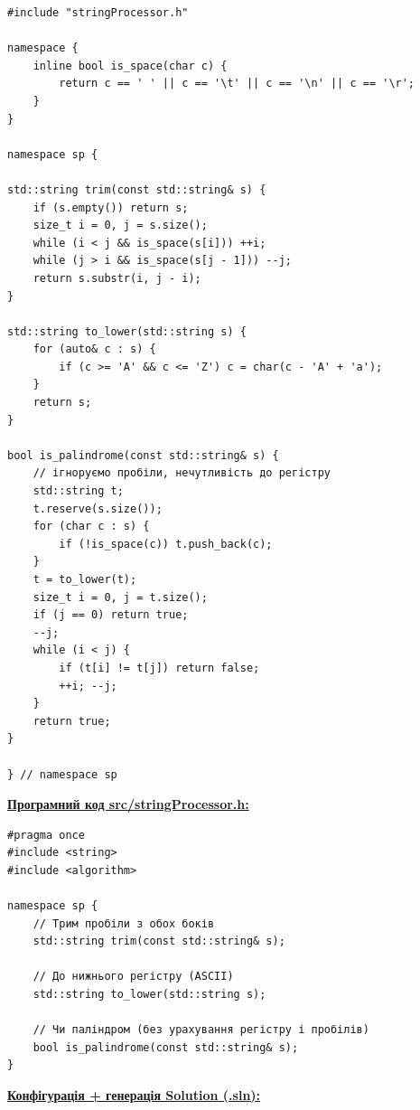 \documentclass[12pt,a4paper]{article}
\begin{document}
    \begin{verbatim}
#include "stringProcessor.h"

namespace {
    inline bool is_space(char c) {
        return c == ' ' || c == '\t' || c == '\n' || c == '\r';
    }
}

namespace sp {

std::string trim(const std::string& s) {
    if (s.empty()) return s;
    size_t i = 0, j = s.size();
    while (i < j && is_space(s[i])) ++i;
    while (j > i && is_space(s[j - 1])) --j;
    return s.substr(i, j - i);
}

std::string to_lower(std::string s) {
    for (auto& c : s) {
        if (c >= 'A' && c <= 'Z') c = char(c - 'A' + 'a');
    }
    return s;
}

bool is_palindrome(const std::string& s) {
    // ігноруємо пробіли, нечутливість до регістру
    std::string t;
    t.reserve(s.size());
    for (char c : s) {
        if (!is_space(c)) t.push_back(c);
    }
    t = to_lower(t);
    size_t i = 0, j = t.size();
    if (j == 0) return true;
    --j;
    while (i < j) {
        if (t[i] != t[j]) return false;
        ++i; --j;
    }
    return true;
}

} // namespace sp
    \end{verbatim}

    \textbf{\underline{Програмний код src/stringProcessor.h:}}

    \begin{verbatim}
#pragma once
#include <string>
#include <algorithm>

namespace sp {
    // Трим пробіли з обох боків
    std::string trim(const std::string& s);

    // До нижнього регістру (ASCII)
    std::string to_lower(std::string s);

    // Чи паліндром (без урахування регістру і пробілів)
    bool is_palindrome(const std::string& s);
}
    \end{verbatim}

    \textbf{\underline{Конфігурація + генерація Solution (.sln):}}
\end{document}
